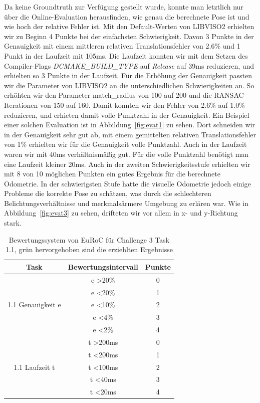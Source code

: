 \documentclass[12pt,titlepage, a4paper]{article}
\begin{document}
Da keine Groundtruth zur Verfügung gestellt wurde, konnte man letztlich nur über die Online-Evaluation herausfinden, wie genau die berechnete Pose ist und wie hoch der relative Fehler ist.
Mit den Default-Werten von \mbox{LIBVISO2} erhielten wir zu Beginn 4 Punkte bei der einfachsten Schwierigkeit. 
Davon 3 Punkte in der Genauigkeit mit einem mittleren relativen Translationsfehler von 2.6\% und 1 Punkt in der Laufzeit mit 105ms.
Die Laufzeit konnten wir mit dem Setzen des Compiler-Flags \textit{DCMAKE\_BUILD\_TYPE} auf \textit{Release} auf 39ms reduzieren, und erhielten so 3 Punkte in der Laufzeit.
Für die Erhöhung der Genauigkeit passten wir die Parameter von \mbox{LIBVISO2} an die unterschiedlichen Schwierigkeiten an. 
So erhöhten wir den Parameter match\_radius von 100 auf 200 und die RANSAC-Iterationen von 150 auf 160.
Damit konnten wir den Fehler von 2.6\% auf 1.0\% reduzieren, und erhieten damit volle Punktzahl in der Genauigkeit.
Ein Beispiel einer solchen Evaluation ist in Abbildung~\ref{fig:evat1} zu sehen. Dort schneiden wir in der Genauigkeit sehr gut ab, mit einem gemittelten relativen Translationsfehler 
von 1\% erhielten wir für die Genauigkeit volle Punktzahl. Auch in der Laufzeit waren wir mit 40ms verhältnismäßig gut. Für die volle Punktzahl benötigt man eine Laufzeit kleiner 20ms.
Auch in der zweiten Schwierigkeitsstufe erhielten wir mit 8 von 10 möglichen Punkten ein gutes Ergebnis für die berechnete Odometrie. In der schwierigsten Stufe hatte die visuelle Odometrie
jedoch einige Probleme die korrekte Pose zu schätzen, was durch die schlechteren Belichtungsverhältnisse und merkmalsärmere Umgebung zu erlären war.
Wie in Abbildung~\ref{fig:evat3} zu sehen, drifteten wir vor allem in x- und y-Richtung stark.


\begin{table}
\centering
\begin{tabular}{c|c|c}
Task & Bewertungsintervall & Punkte\\
\hline
\multirow{5}{*}{1.1 Genauigkeit e} & e \textgreater 20\% & 0 \\
 & e \textless 20\% & 1\\  
  & e \textless 10\% & 2\\
   & e \textless 4\% & 3\\
 &\cellcolor{green!10.0} e \textless 2\% & \cellcolor{green!10.0}4\\
\hline
\multirow{5}{*}{1.1 Laufzeit t} & t \textgreater 200ms & 0 \\
 & t \textless 200ms & 1\\  
  & t \textless 100ms & 2\\
  & \cellcolor{green!10.0}t \textless 40ms &\cellcolor{green!10.0} 3\\
 & t \textless 20ms & 4\\
\hline
\end{tabular}\\
\vspace{10mm}
\caption{Bewertungssystem von EuRoC für Challenge 3 Task 1.1, grün hervorgehoben sind die erziehlten Ergebnisse}
\label{table:scoringt1}
\end{table}
\end{document}
